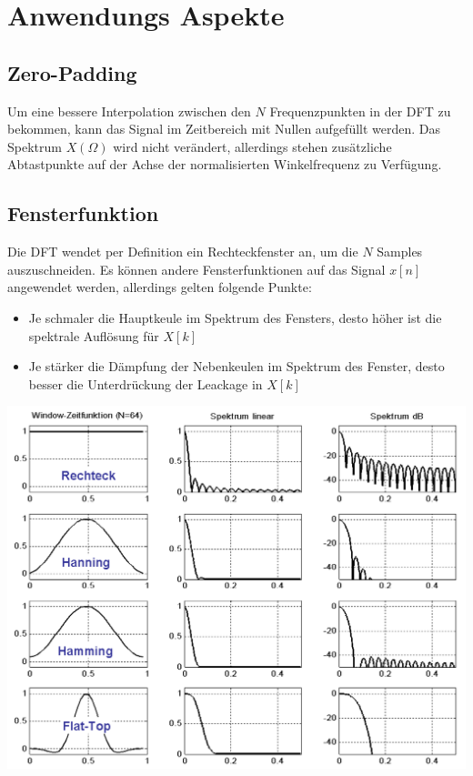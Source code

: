 \section{Anwendungs Aspekte}
\subsection{Zero-Padding}
Um eine bessere Interpolation zwischen den $N$ Frequenzpunkten in der DFT zu
bekommen, kann das Signal im Zeitbereich mit Nullen aufgefüllt werden.
Das Spektrum $X(\Omega)$ wird nicht verändert, allerdings stehen zusätzliche
Abtastpunkte auf der Achse der normalisierten Winkelfrequenz zu Verfügung.

\subsection{Fensterfunktion}
Die DFT wendet per Definition ein Rechteckfenster an, um die $N$ Samples
auszuschneiden. Es können andere Fensterfunktionen auf das Signal $x[n]$
angewendet werden, allerdings gelten folgende Punkte:
\begin{itemize}
	\item Je schmaler die Hauptkeule im Spektrum des Fensters, desto höher ist
	die spektrale Auflösung für $X[k]$
	\item Je stärker die Dämpfung der Nebenkeulen im Spektrum des Fenster, desto
	besser die Unterdrückung der Leackage in $X[k]$
\end{itemize}

\begin{center}
	\includegraphics[scale=.7]{./images/windows}
\end{center}

